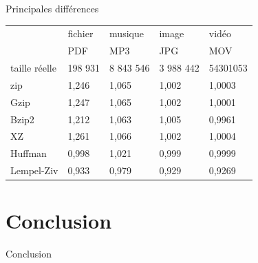 \documentclass[french]{beamer}
\begin{document}
\begin{frame}{Principales différences}
	\begin{flushleft}
\begin{tabular}{|l|l|l|l|l|}
\hline
 & fichier & musique & image & vidéo\\
 &  PDF & MP3 & JPG & MOV \\ 
\hline
taille réelle &  198 931 & 8 843 546 & 3 988 442 & 54301053 \\\hline
zip  & 1,246 & 1,065 & 1,002 & 1,0003 \\
\hline
Gzip & 1,247 & 1,065 & 1,002 & 1,0001 \\
\hline
Bzip2 & 1,212 & 1,063 & 1,005 & 0,9961\\
\hline
XZ & 1,261 & 1,066 & 1,002 & 1,0004\\
\hline
Huffman & 0,998 & 1,021 & 0,999 & 0,9999 \\
\hline
Lempel-Ziv & 0,933 & 0,979 & 0,929 & 0,9269\\
\hline

\end{tabular}
\end{flushleft}
\end{frame}

\section{Conclusion}
\begin{frame}{Conclusion}
	\begin{center}
	\end{center}
\end{frame}
\end{document}
